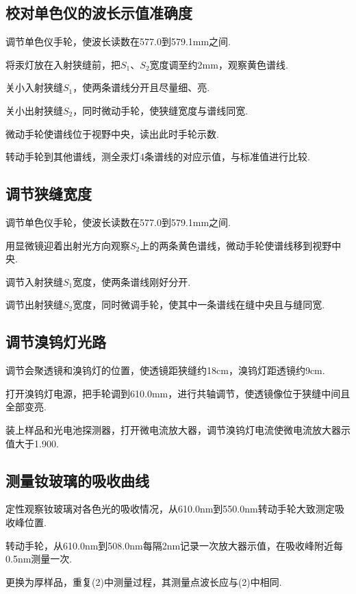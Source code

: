 \documentclass{thureport}
\begin{document}
\subsection{校对单色仪的波长示值准确度}
\begin{clause}
	\item 调节单色仪手轮，使波长读数在577.0到579.1mm之间.
	\item 将汞灯放在入射狭缝前，把$S_1$、$S_2$宽度调至约2mm，观察黄色谱线.
	\item 关小入射狭缝$S_1$，使两条谱线分开且尽量细、亮.
	\item 关小出射狭缝$S_2$，同时微动手轮，使狭缝宽度与谱线同宽.
	\item 微动手轮使谱线位于视野中央，读出此时手轮示数.
	\item 转动手轮到其他谱线，测全汞灯4条谱线的对应示值，与标准值进行比较.
\end{clause}

\subsection{调节狭缝宽度}
\begin{clause}
	\item 调节单色仪手轮，使波长读数在577.0到579.1mm之间.
	\item 用显微镜迎着出射光方向观察$S_2$上的两条黄色谱线，微动手轮使谱线移到视野中央.
	\item 调节入射狭缝$S_1$宽度，使两条谱线刚好分开.
	\item 调节出射狭缝$S_2$宽度，同时微调手轮，使其中一条谱线在缝中央且与缝同宽.
\end{clause}

\subsection{调节溴钨灯光路}
\begin{clause}
	\item 调节会聚透镜和溴钨灯的位置，使透镜距狭缝约18cm，溴钨灯距透镜约9cm.
	\item 打开溴钨灯电源，把手轮调到610.0mm，进行共轴调节，使透镜像位于狭缝中间且全部变亮.
	\item 装上样品和光电池探测器，打开微电流放大器，调节溴钨灯电流使微电流放大器示值大于1.900.
\end{clause}

\subsection{测量钕玻璃的吸收曲线}
\begin{clause}
	\item 定性观察钕玻璃对各色光的吸收情况，从610.0nm到550.0nm转动手轮大致测定吸收峰位置.
	\item 转动手轮，从610.0nm到508.0nm每隔2nm记录一次放大器示值，在吸收峰附近每0.5nm测量一次.
	\item 更换为厚样品，重复(2)中测量过程，其测量点波长应与(2)中相同.
\end{clause}
\end{document}
